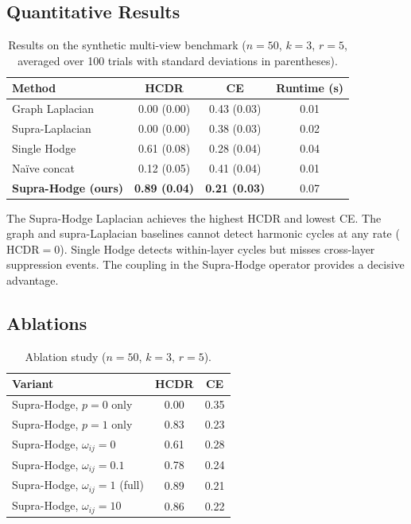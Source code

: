 \documentclass[11pt]{article}
\theoremstyle{definition}
\theoremstyle{remark}
\begin{document}
\subsection{Quantitative Results}

\begin{table}[h]
\centering
\caption{Results on the synthetic multi-view benchmark ($n=50$, $k=3$, $r=5$,
averaged over 100 trials with standard deviations in parentheses).}
\label{tab:results}
\begin{tabular}{lccc}
\toprule
Method & HCDR & CE & Runtime (s)\\
\midrule
Graph Laplacian  & 0.00 (0.00) & 0.43 (0.03) & 0.01\\
Supra-Laplacian  & 0.00 (0.00) & 0.38 (0.03) & 0.02\\
Single Hodge     & 0.61 (0.08) & 0.28 (0.04) & 0.04\\
Na\"ive concat   & 0.12 (0.05) & 0.41 (0.04) & 0.01\\
\textbf{Supra-Hodge (ours)} & \textbf{0.89 (0.04)} & \textbf{0.21 (0.03)} & 0.07\\
\bottomrule
\end{tabular}
\end{table}

The Supra-Hodge Laplacian achieves the highest HCDR and lowest CE. The graph
and supra-Laplacian baselines cannot detect harmonic cycles at any rate
($\text{HCDR}=0$). Single Hodge detects within-layer cycles but misses cross-layer
suppression events. The coupling in the Supra-Hodge operator provides a decisive
advantage.

\subsection{Ablations}

\begin{table}[h]
\centering
\caption{Ablation study ($n=50$, $k=3$, $r=5$).}
\label{tab:ablation}
\begin{tabular}{lcc}
\toprule
Variant & HCDR & CE\\
\midrule
Supra-Hodge, $p=0$ only & 0.00 & 0.35\\
Supra-Hodge, $p=1$ only & 0.83 & 0.23\\
Supra-Hodge, $\omega_{ij}=0$ & 0.61 & 0.28\\
Supra-Hodge, $\omega_{ij}=0.1$ & 0.78 & 0.24\\
Supra-Hodge, $\omega_{ij}=1$ (full) & 0.89 & 0.21\\
Supra-Hodge, $\omega_{ij}=10$ & 0.86 & 0.22\\
\bottomrule
\end{tabular}
\end{table}
\end{document}
